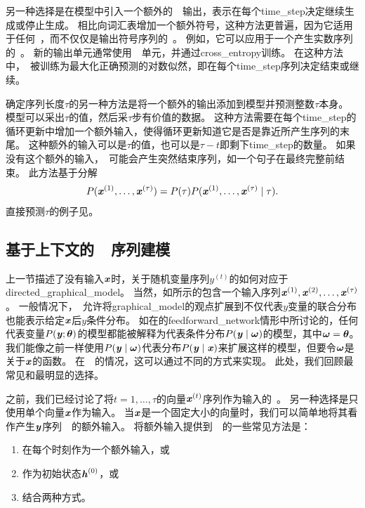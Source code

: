 
另一种选择是在模型中引入一个额外的~~输出，表示在每个\gls{time_step}决定继续生成或停止生成。
相比向词汇表增加一个额外符号，这种方法更普遍，因为它适用于任何~，而不仅仅是输出符号序列的~。
例如，它可以应用于一个产生实数序列的~。
新的输出单元通常使用~~单元，并通过\gls{cross_entropy}训练。
在这种方法中，~被训练为最大化正确预测的对数似然，即在每个\gls{time_step}序列决定结束或继续。

确定序列长度$\tau$的另一种方法是将一个额外的输出添加到模型并预测整数$\tau$本身。
模型可以采出$\tau$的值，然后采$\tau$步有价值的数据。
这种方法需要在每个\gls{time_step}的循环更新中增加一个额外输入，使得循环更新知道它是否是靠近所产生序列的末尾。
这种额外的输入可以是$\tau$的值，也可以是$\tau - t$即剩下\gls{time_step}的数量。
如果没有这个额外的输入，~可能会产生突然结束序列，如一个句子在最终完整前结束。
此方法基于分解
\begin{align}
 P(\boldsymbol{\mathit{x}}^{(1)},\dots, \boldsymbol{\mathit{x}}^{(\tau)}) = P(\tau) P(\boldsymbol{\mathit{x}}^{(1)},\dots,\boldsymbol{\mathit{x}}^{(\tau)} \mid \tau) .
\end{align}
直接预测$\tau$的例子见\cite{Goodfellow+et+al-ICLR2014a}。

\subsection{基于上下文的~~序列建模}
\label{sec:modeling_sequences_conditioned_on_context_with_rnns}
上一节描述了没有输入$\boldsymbol{\mathit{x}}$时，关于随机变量序列$y^{(t)}$的如何对应于\gls{directed_graphical_model}。
当然，如所示的包含一个输入序列$\boldsymbol{\mathit{x}}^{(1)},\boldsymbol{\mathit{x}}^{(2)},\dots,\boldsymbol{\mathit{x}}^{(\tau)}$。
一般情况下，~允许将\gls{graphical_model}的观点扩展到不仅代表$y$变量的联合分布也能表示给定$\boldsymbol{\mathit{x}}$后$y$条件分布。
如在的\gls{feedforward_network}情形中所讨论的，任何代表变量$P(\boldsymbol{\mathit{y}};\boldsymbol{\theta})$的模型都能被解释为代表条件分布$P(\boldsymbol{\mathit{y}} \mid \boldsymbol{\omega})$的模型，其中$\boldsymbol{\omega}=\boldsymbol{\theta}$。
我们能像之前一样使用$P(\boldsymbol{\mathit{y}} \mid \boldsymbol{\omega})$代表分布$P(\boldsymbol{\mathit{y}} \mid \boldsymbol{\mathit{x}})$来扩展这样的模型，但要令$\boldsymbol{\omega}$是关于$\boldsymbol{\mathit{x}}$的函数。
在~~的情况，这可以通过不同的方式来实现。
此处，我们回顾最常见和最明显的选择。


之前，我们已经讨论了将$t =1, \dots, \tau$的向量$\boldsymbol{\mathit{x}}^{(t)}$序列作为输入的~。
另一种选择是只使用单个向量$\boldsymbol{\mathit{x}}$作为输入。
当$\boldsymbol{\mathit{x}}$是一个固定大小的向量时，我们可以简单地将其看作产生$\boldsymbol{\mathit{y}}$序列~~的额外输入。
将额外输入提供到~~的一些常见方法是：
\begin{enumerate}
 \item 在每个时刻作为一个额外输入，或
 \item 作为初始状态$\boldsymbol{\mathit{h}}^{(0)}$，或
 \item 结合两种方式。
\end{enumerate}

